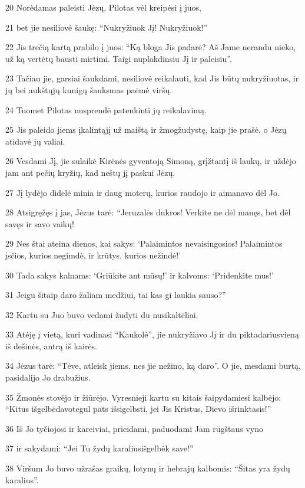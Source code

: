 \par 20 Norėdamas paleisti Jėzų, Pilotas vėl kreipėsi į juos, 
\par 21 bet jie nesiliovė šaukę: “Nukryžiuok Jį! Nukryžiuok!” 
\par 22 Jis trečią kartą prabilo į juos: “Ką bloga Jis padarė? Aš Jame nerandu nieko, už ką vertėtų bausti mirtimi. Taigi nuplakdinsiu Jį ir paleisiu”. 
\par 23 Tačiau jie, garsiai šaukdami, nesiliovė reikalauti, kad Jis būtų nukryžiuotas, ir jų bei aukštųjų kunigų šauksmas paėmė viršų. 
\par 24 Tuomet Pilotas nusprendė patenkinti jų reikalavimą. 
\par 25 Jis paleido jiems įkalintąjį už maištą ir žmogžudystę, kaip jie prašė, o Jėzų atidavė jų valiai. 
\par 26 Vesdami Jį, jie sulaikė Kirėnės gyventoją Simoną, grįžtantį iš laukų, ir uždėjo jam ant pečių kryžių, kad neštų jį paskui Jėzų. 
\par 27 Jį lydėjo didelė minia ir daug moterų, kurios raudojo ir aimanavo dėl Jo. 
\par 28 Atsigręžęs į jas, Jėzus tarė: “Jeruzalės dukros! Verkite ne dėl manęs, bet dėl savęs ir savo vaikų! 
\par 29 Nes štai ateina dienos, kai sakys: ‘Palaimintos nevaisingosios! Palaimintos įsčios, kurios negimdė, ir krūtys, kurios nežindė!’ 
\par 30 Tada sakys kalnams: ‘Griūkite ant mūsų!’ ir kalvoms: ‘Pridenkite mus!’ 
\par 31 Jeigu šitaip daro žaliam medžiui, tai kas gi laukia sauso?” 
\par 32 Kartu su Juo buvo vedami žudyti du nusikaltėliai. 
\par 33 Atėję į vietą, kuri vadinasi “Kaukolė”, jie nukryžiavo Jį ir du piktadarius­vieną iš dešinės, antrą iš kairės. 
\par 34 Jėzus tarė: “Tėve, atleisk jiems, nes jie nežino, ką daro”. O jie, mesdami burtą, pasidalijo Jo drabužius. 
\par 35 Žmonės stovėjo ir žiūrėjo. Vyresnieji kartu su kitais šaipydamiesi kalbėjo: “Kitus išgelbėdavo­tegul pats išsigelbsti, jei Jis­ Kristus, Dievo išrinktasis!” 
\par 36 Iš Jo tyčiojosi ir kareiviai, prieidami, paduodami Jam rūgštaus vyno 
\par 37 ir sakydami: “Jei Tu žydų karalius­išgelbėk save!” 
\par 38 Viršum Jo buvo užrašas graikų, lotynų ir hebrajų kalbomis: “Šitas yra žydų karalius”. 
